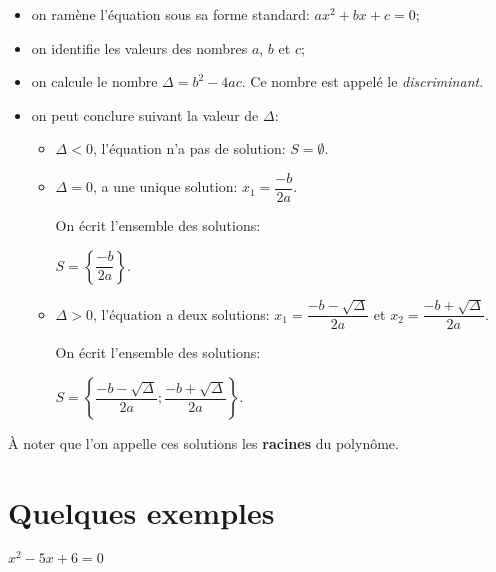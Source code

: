 \documentclass[a4paper,12pt]{scrartcl}
\begin{document}
\begin{itemize}
\item on ramène l’équation sous sa forme standard: $ax^2 + bx + c = 0$;
\item on identifie les valeurs des nombres $a$, $b$ et $c$;
\item on calcule le nombre $\Delta = b^2 - 4ac$. Ce nombre est appelé le \emph{discriminant}.
\item on peut conclure suivant la valeur de $\Delta$:

\begin{itemize}
\item $\Delta < 0$, l'équation n'a pas de solution: $S = \emptyset$.
\item $\Delta = 0$, a une unique solution: $x_1 = \dfrac{-b}{2a}$.

On écrit l'ensemble des solutions:

$S = \left\lbrace \dfrac{-b}{2a} \right\rbrace$.

\item $\Delta > 0$, l'équation a deux solutions: $x_1 = \dfrac{-b - \sqrt{\Delta}}{2a}$ et $x_2 = \dfrac{-b + \sqrt{\Delta}}{2a}$.

On écrit l'ensemble des solutions:

$S = \left\lbrace \dfrac{-b - \sqrt{\Delta}}{2a} ; \dfrac{-b + \sqrt{\Delta}}{2a} \right\rbrace$.

\end{itemize}
\end{itemize}

À noter que l'on appelle ces solutions les \textbf{racines} du polynôme.




\section{Quelques exemples}

\exemple{}
$x^2 - 5x + 6 = 0$
\end{document}
